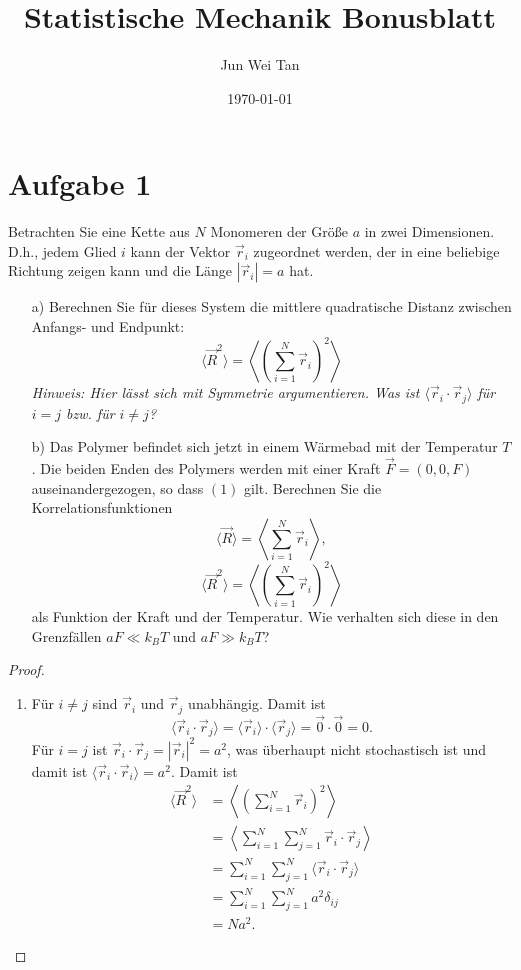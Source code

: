 \documentclass[prb,12pt]{revtex4-2}
\theoremstyle{definition}
\theoremstyle{definition}
\begin{document}
\title{Statistische Mechanik Bonusblatt}
	\author{Jun Wei Tan}
	\date{\today}
	\maketitle
\tableofcontents

\section{Aufgabe 1}
Betrachten Sie eine Kette aus \( N \) Monomeren der Größe \( a \) in zwei Dimensionen. D.h., jedem Glied \( i \) kann der Vektor \( \vec{r}_i \) zugeordnet werden, der in eine beliebige Richtung zeigen kann und die Länge \( |\vec{r}_i| = a \) hat.

\begin{enumerate}
	\item[a)] Berechnen Sie für dieses System die mittlere quadratische Distanz zwischen Anfangs- und Endpunkt:
	\[
	\langle \vec{R}^2 \rangle = \left\langle \left( \sum_{i=1}^N \vec{r}_i \right)^2 \right\rangle
	\]
	\textit{Hinweis: Hier lässt sich mit Symmetrie argumentieren. Was ist \( \langle \vec{r}_i \cdot \vec{r}_j \rangle \) für \( i = j \) bzw. für \( i \neq j \)?}
	
	\item[b)] Das Polymer befindet sich jetzt in einem Wärmebad mit der Temperatur \( T \). Die beiden Enden des Polymers werden mit einer Kraft \( \vec{F} = (0, 0, F) \) auseinandergezogen, so dass \((1)\) gilt. Berechnen Sie die Korrelationsfunktionen
	\[
	\langle \vec{R} \rangle = \left\langle \sum_{i=1}^N \vec{r}_i \right\rangle,
	\]
	\[
	\langle \vec{R}^2 \rangle = \left\langle \left( \sum_{i=1}^N \vec{r}_i \right)^2 \right\rangle
	\]
	als Funktion der Kraft und der Temperatur. Wie verhalten sich diese in den Grenzfällen \( aF \ll k_B T \) und \( aF \gg k_B T \)?
\end{enumerate}
\begin{proof}
	\begin{enumerate}[label=\alph*)]
		\item Für $i\neq j$ sind $\vec{r}_i$ und $\vec{r}_j$ unabhängig. Damit ist
		\[\langle \vec{r}_i \cdot \vec{r}_j\rangle = \langle \vec{r}_i\rangle \cdot \langle \vec{r}_j\rangle = \vec{0}\cdot \vec{0}=0.\]
		F\"{u}r $i=j$ ist $\vec{r}_i\cdot \vec{r}_j= |\vec{r}_i|^2=a^2$, was überhaupt nicht stochastisch ist und damit ist $\langle \vec{r}_i \cdot \vec{r}_i\rangle = a^2$. Damit ist
		\begin{align*}
			\langle \vec{R}^2 \rangle &= \left\langle \left( \sum_{i=1}^N \vec{r}_i \right)^2 \right\rangle \\
			&= \left\langle \sum_{i=1}^N \sum_{j=1}^N \vec{r}_i \cdot \vec{r}_j \right\rangle\\
			&=\sum_{i=1}^N \sum_{j=1}^N \langle \vec{r}_i \cdot \vec{r}_j \rangle\\
			&=\sum_{i=1}^N \sum_{j=1}^N a^2 \delta_{ij}\\
			&= Na^2.
		\end{align*}
	\end{enumerate}
\end{proof}
\end{document}
